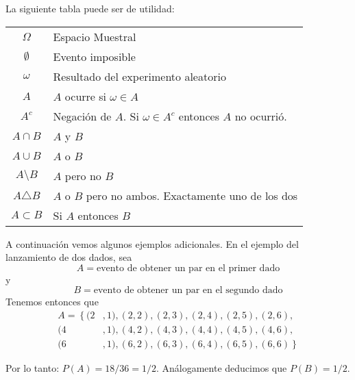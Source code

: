 \documentclass[14pt]{extreport}
\newcounter{ejemplo}[chapter]
\begin{document}
La siguiente tabla puede ser de utilidad:
\renewcommand{\arraystretch}{1.5}
     \begin{table}
         \centering
         \begin{tabular}{|c|l|}
         \hline
              $\Omega$    & Espacio Muestral  \\
              $\emptyset$ & Evento imposible \\
              $\omega$    & Resultado del experimento aleatorio\\
              $A$         & $A$ ocurre si $\omega \in A$ \\
              $A^c$       & Negación de $A$. Si $\omega \in A^c$ entonces $A$ no ocurrió.\\
              $A\cap B$   & $A$ y $B$\\
              $A\cup B$   & $A$ o $B$\\
              $A\setminus B$   & $A$ pero no $B$\\
              $A\triangle B$   & $A$ o $B$ pero no ambos. Exactamente uno de los dos\\
              $A\subset B$   & Si $A$ entonces $B$\\
         \hline
         \end{tabular}
     \end{table}
A continuación vemos algunos ejemplos adicionales. En el ejemplo del lanzamiento de dos dados, sea 
$$
A = \text{evento de obtener un par en el primer dado}
$$
y
$$
B = \text{evento de obtener un par en el segundo dado}
$$
Tenemos entonces que 
\begin{equation*}
    \begin{split}
    A = \left\{\right.(2&, 1), (2, 2), (2, 3), (2, 4), (2, 5), (2,6),  \\
                      (4&, 1), (4, 2), (4, 3), (4, 4), (4, 5), (4, 6), \\       
                      (6&, 1), (6, 2), (6, 3), (6, 4), (6, 5), (6, 6)   \left.\right\}
    \end{split}
\end{equation*}

Por lo tanto: $P(A) = 18/36 = 1/2$. Análogamente deducimos que $P(B) = 1/2$.
\end{document}
